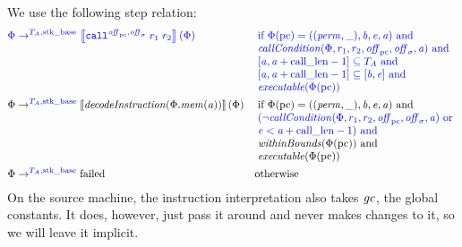 \documentclass[a4paper]{article}
\begin{document}
We use the following step relation:
\begin{align*}
  \src{\Phi} & \; \src{\step[\src{\ta,\stkb}] \sem{\scall{\offpc,\offsigma}{r_1}{r_2}}(\Phi)} &  &\sourcecolor\left.\arraycolsep=0pt
                                                  \begin{array}[t]{l}
                                                    \text{if }\Phi(\pcreg) 
= ((\perm,\_),\baddr,\eaddr,\aaddr) \tand \\
                                                    \callCond{\Phi,r_1,r_2,\offpc,\offsigma,\aaddr} \tand\\
                                                    \lbrack \aaddr ,\aaddr + \calllen - 1\rbrack \subseteq \ta \tand \\
                                                    \lbrack\aaddr,\aaddr + \calllen-1\rbrack \subseteq [\baddr,\eaddr] \tand \\
                                                    \exec{\Phi(\pcreg)}
                                                  \end{array}\right.\\
  \Phi & \step[\src{\ta,\stkb}] \sem{\decInstr{\Phi.\mem(\aaddr)}}(\Phi) & &\left.\arraycolsep=0pt
                                                  \begin{array}[t]{l}
                                                    \text{if }\Phi(\pcreg) = ((\perm,\_),\baddr,\eaddr,\aaddr) \tand \\
                                                    \src{(\neg\callCond{\Phi,r_1,r_2,\offpc,\offsigma,\aaddr} \tor}\\
                                                    \src{\eaddr < \aaddr + \calllen-1) \tand} \\
                                                    \withinBounds{\Phi(\pcreg)} \tand \\
                                                    \exec{\Phi(\pcreg)}
                                                  \end{array}\right.\\
  \Phi& \step[\src{\ta,\stkb}] \failed & & \totherwise
\end{align*}
On the source machine, the instruction interpretation also takes $\mathit{gc}$, the global constants.
It does, however, just pass it around and never makes changes to it, so we will leave it implicit.
\end{document}
